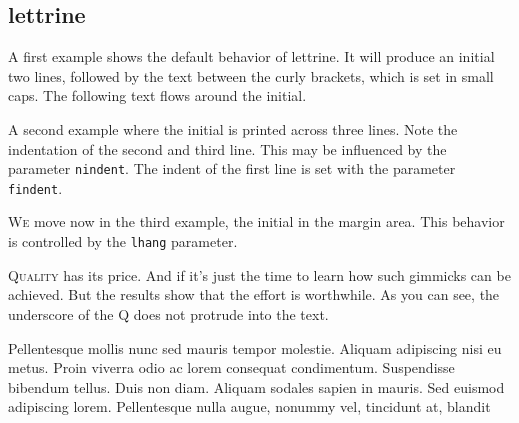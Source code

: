 \subsection{lettrine}

\begin{filecontents*}{\democodefile}
\lettrine{A}{} first example shows the default behavior of lettrine.
It will produce an initial two lines, followed by the text between
the curly brackets, which is set in small caps. The following text flows
 around the initial.
\end{filecontents*}

%

\begin{filecontents*}{\democodefile}
\lettrine[lines=3]{A}{} second example where the initial is printed across
three lines. Note the indentation of the second and third line. This may be
influenced by the parameter \texttt{nindent}. The indent of the first line is set with the parameter \texttt{findent}.
\end{filecontents*}

%

\begin{filecontents*}{\democodefile}
\lettrine[lhang=1, nindent=0pt, lines=3]{W}{e} move now in the third example,
the initial in the margin area. This behavior is controlled by the
\texttt{lhang} parameter.
\end{filecontents*}

%


\begin{filecontents*}{\democodefile}
\lettrine[lines=4, loversize=-.1, lraise=.1]{Q}{uality} has its price. And if
it's just the time to learn how such gimmicks can be achieved. But the
results show that the effort is worthwhile. As you can see, the underscore
of the Q does not protrude into the text.
\end{filecontents*}

%

\begin{filecontents*}{\democodefile}
\begin{boxedminipage}{0.5\textwidth}
Pellentesque mollis nunc sed mauris tempor molestie. Aliquam adipiscing nisi eu metus. Proin viverra odio ac lorem consequat condimentum. Suspendisse bibendum tellus. Duis non diam. Aliquam sodales sapien in mauris. Sed euismod adipiscing lorem. Pellentesque nulla augue, nonummy vel, tincidunt at, blandit 
\end{boxedminipage}
\end{filecontents*}

